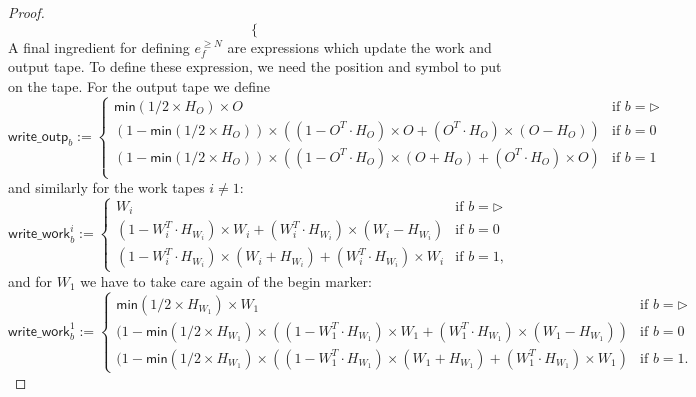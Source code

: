 \begin{proof}
$$\begin{cases}
\end{cases}
$$
A final ingredient for defining $e_f^{\geq N}$ are expressions which update the work and output tape.
To define these expression, we need the position and symbol to put on the tape. For the output tape we define
$$
\mathsf{write\_outp}_b:=\begin{cases}
\mathsf{min}(1/2\times H_O)\times O & \text{if $b=\rhd$}\\
(1-\mathsf{min}(1/2\times H_O))\times\left((1-O^T\cdot H_O)\times O + (O^T\cdot H_O)\times (O-H_O)\right) &\text{if $b=0$}\\
(1-\mathsf{min}(1/2\times H_O))\times\left((1-O^T\cdot H_O)\times (O+H_O) + (O^T\cdot H_O)\times O\right) &\text{if $b=1$}\\
\end{cases}
$$
and similarly for the work tapes $i\neq 1$:
$$
\mathsf{write\_work}_b^i:=\begin{cases}
W_i & \text{if $b=\rhd$}\\
(1-W_i^T\cdot H_{W_i})\times W_i + (W_i^T\cdot H_{W_i})\times (W_i-H_{W_i}) &\text{if $b=0$}\\
(1-W_i^T\cdot H_{W_i})\times (W_i+H_{W_i}) + (W_i^T\cdot H_{W_i})\times W_i &\text{if $b=1$},
\end{cases}
$$
and for  $W_1$ we have to take care again of the begin marker:
$$
\mathsf{write\_work}_b^1:=\begin{cases}
\mathsf{min}(1/2\times H_{W_1})\times W_1 & \text{if $b=\rhd$}\\
(1-\mathsf{min}(1/2\times H_{W_1})\times\left((1-W_1^T\cdot H_{W_1})\times W_1 + (W_1^T\cdot H_{W_1})\times (W_1-H_{W_1})\right) &\text{if $b=0$}\\
(1-\mathsf{min}(1/2\times H_{W_1})\times\left((1-W_1^T\cdot H_{W_1})\times (W_1+H_{W_1}) + (W_1^T\cdot H_{W_1})\times W_1\right) &\text{if $b=1$}.
\end{cases}
$$





\end{proof}
